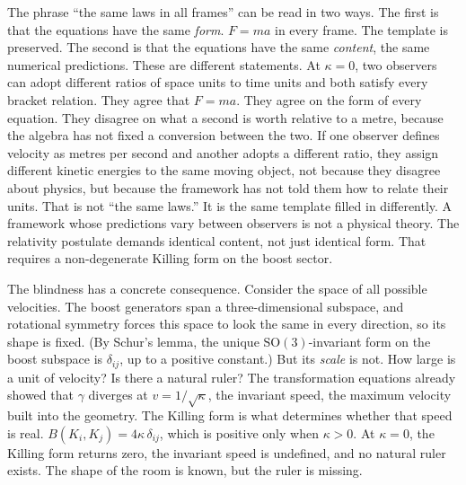 \documentclass[11pt]{article}
\begin{document}
The phrase ``the same laws in all frames'' can be read in two ways. The first is that the equations have the same \emph{form}. $F = ma$ in every frame. The template is preserved. The second is that the equations have the same \emph{content}, the same numerical predictions. These are different statements. At $\kappa = 0$, two observers can adopt different ratios of space units to time units and both satisfy every bracket relation. They agree that $F = ma$. They agree on the form of every equation. They disagree on what a second is worth relative to a metre, because the algebra has not fixed a conversion between the two. If one observer defines velocity as metres per second and another adopts a different ratio, they assign different kinetic energies to the same moving object, not because they disagree about physics, but because the framework has not told them how to relate their units. That is not ``the same laws.'' It is the same template filled in differently. A framework whose predictions vary between observers is not a physical theory. The relativity postulate demands identical content, not just identical form. That requires a non-degenerate Killing form on the boost sector.

The blindness has a concrete consequence. Consider the space of all possible velocities. The boost generators span a three-dimensional subspace, and rotational symmetry forces this space to look the same in every direction, so its shape is fixed. (By Schur's lemma, the unique $\mathrm{SO}(3)$-invariant form on the boost subspace is $\delta_{ij}$, up to a positive constant.) But its \emph{scale} is not. How large is a unit of velocity? Is there a natural ruler? The transformation equations already showed that $\gamma$ diverges at $v = 1/\sqrt{\kappa}$, the invariant speed, the maximum velocity built into the geometry. The Killing form is what determines whether that speed is real. $B(K_i, K_j) = 4\kappa\,\delta_{ij}$, which is positive only when $\kappa > 0$. At $\kappa = 0$, the Killing form returns zero, the invariant speed is undefined, and no natural ruler exists. The shape of the room is known, but the ruler is missing.
\end{document}
